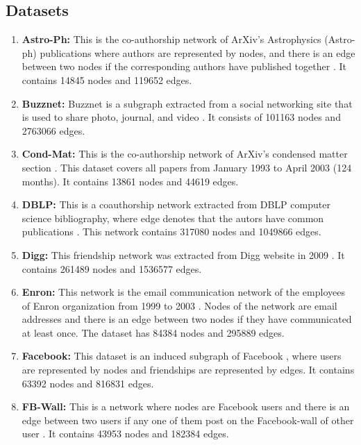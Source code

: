 \documentclass[12pt,3p]{article}
\begin{document}
\subsection*{Datasets}

\begin{enumerate}
\item \textbf{Astro-Ph:} This is the co-authorship network of ArXiv's Astrophysics (Astro-ph) publications where authors are represented by nodes, and there is an edge between two nodes if the corresponding authors have published together \cite{leskovec2007graph}. It contains 14845 nodes and 119652 edges.

\item \textbf{Buzznet:} Buzznet is a subgraph extracted from a social networking site that is used to share photo, journal, and video \cite{zafarani2009social}. It consists of 101163 nodes and 2763066 edges.

\item \textbf{Cond-Mat:} This is the co-authorship network of ArXiv's condensed matter section \cite{leskovec2007graph}. This dataset covers all papers from January 1993 to April 2003 (124 months). It contains 13861 nodes and 44619 edges.

\item \textbf{DBLP:} This is a coauthorship network extracted from DBLP computer science bibliography, where edge denotes that the autors have common publications \cite{yang2015defining}. This network contains 317080 nodes and 1049866 edges.

\item \textbf{Digg:} This friendship network was extracted from Digg website in 2009 \cite{hogg2012social}. It contains 261489 nodes and 1536577 edges.

\item \textbf{Enron:} This network is the email communication network of the employees of Enron organization from 1999 to 2003 \cite{klimt2004enron}. Nodes of the network are email addresses and there is an edge between two nodes if they have communicated at least once. The dataset has 84384 nodes and 295889 edges. 

\item \textbf{Facebook:} This dataset is an induced subgraph of Facebook \cite{viswanath2009evolution}, where users are represented by nodes and friendships are represented by edges. It contains 63392 nodes and 816831 edges.

\item \textbf{FB-Wall:} This is a network where nodes are Facebook users and there is an edge between two users if any one of them post on the Facebook-wall of other user \cite{viswanath2009evolution}. It contains 43953 nodes and 182384 edges.


\end{enumerate}
\end{document}
